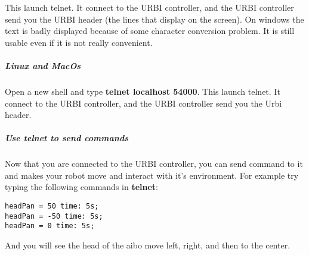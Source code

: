 This launch telnet. It connect to the URBI controller, and the URBI
controller send you the URBI header (the lines that display on the
screen). On windows the text is badly displayed because of some
character conversion problem. It is still usable even if it is not
really convenient.




\subparagraph{Linux and MacOs}
\label{webots.firstrun.clientsoftware.telnet.linuxandmacos}%

Open a new shell and type \textbf{telnet localhost 54000}.  This
launch telnet. It connect to the URBI controller, and the URBI
controller send you the Urbi header.




\subparagraph{Use telnet to send commands}
\label{webots.firstrun.clientsoftware.telnet.usetelnet}%

Now that you are connected to the URBI controller, you can send
command to it and makes your robot move and interact with it's
environment. For example try typing the following commands in
\textbf{telnet}:

\begin{lstlisting}
headPan = 50 time: 5s;
headPan = -50 time: 5s;
headPan = 0 time: 5s;
\end{lstlisting}
And you will see the head of the aibo move left, right, and then to
the center.




